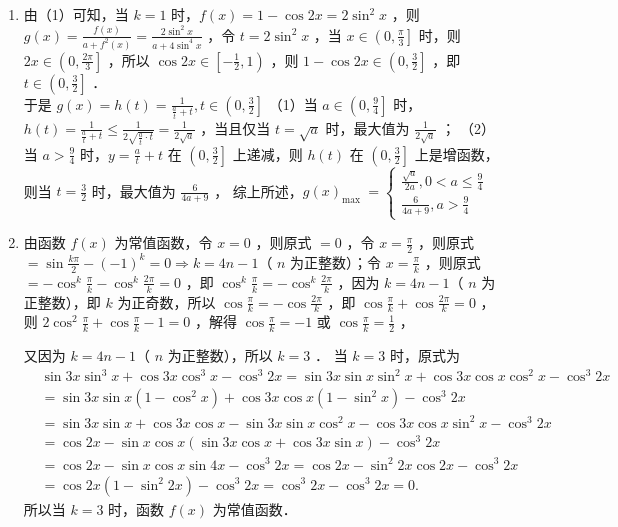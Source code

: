 \begin{enumerate}
\begin{jieda}
\begin{enumerate}[(1)]
    \item 由（1）可知，当 $k=1$ 时，$f(x)=1-\cos 2 x=2 \sin ^2 x$ ，则 $g(x)=\frac{f(x)}{a+f^2(x)}=\frac{2 \sin ^2 x}{a+4 \sin ^4 x}$ ，令 $t=2 \sin ^2 x$ ，当 $x \in\left(0, \frac{\pi}{3}\right]$ 时，则 $2 x \in\left(0, \frac{2 \pi}{3}\right]$ ，所以 $\cos 2 x \in\left[-\frac{1}{2}, 1\right)$ ，则 $1-\cos 2 x \in\left(0, \frac{3}{2}\right]$ ，即 $t \in\left(0, \frac{3}{2}\right]$ ．\\
    于是 $g(x)=h(t)=\frac{1}{\frac{a}{t}+t}, t \in\left(0, \frac{3}{2}\right]$
（1）当 $a \in\left(0, \frac{9}{4}\right]$ 时，$h(t)=\frac{1}{\frac{a}{t}+t} \leq \frac{1}{2 \sqrt{\frac{a}{t} \cdot t}}=\frac{1}{2 \sqrt{a}}$ ，当且仅当 $t=\sqrt{a}$ 时，最大值为 $\frac{1}{2 \sqrt{a}}$ ；
（2）当 $a>\frac{9}{4}$ 时，$y=\frac{a}{t}+t$ 在 $\left(0, \frac{3}{2}\right]$ 上递减，则 $h(t)$ 在 $\left(0, \frac{3}{2}\right]$ 上是增函数，则当 $t=\frac{3}{2}$ 时，最大值为 $\frac{6}{4 a+9}$ ，
综上所述，$g(x)_{\text {max }}=\left\{\begin{array}{l}\frac{\sqrt{a}}{2 a}, 0<a \leq \frac{9}{4} \\ \frac{6}{4 a+9}, a>\frac{9}{4}\end{array}\right.$
    \item 由函数 $f(x)$ 为常值函数，令 $x=0$ ，则原式 $=0$ ，令 $x=\frac{\pi}{2}$ ，则原式 $=\sin \frac{k \pi}{2}-(-1)^k=0 \Rightarrow k=4 n-1$（ $n$ 为正整数）；令 $x=\frac{\pi}{k}$ ，则原式 $=-\cos ^k \frac{\pi}{k}-\cos ^k \frac{2 \pi}{k}=0$ ，即 $\cos ^k \frac{\pi}{k}=-\cos ^k \frac{2 \pi}{k}$ ，因为 $k=4 n-1$（ $n$ 为正整数），即 $k$ 为正奇数，所以 $\cos \frac{\pi}{k}=-\cos \frac{2 \pi}{k}$ ，即 $\cos \frac{\pi}{k}+\cos \frac{2 \pi}{k}=0$ ，则 $2 \cos ^2 \frac{\pi}{k}+\cos \frac{\pi}{k}-1=0$ ，解得 $\cos \frac{\pi}{k}=-1$ 或 $\cos \frac{\pi}{k}=\frac{1}{2}$ ，

又因为 $k=4 n-1$（ $n$ 为正整数），所以 $k=3$ ．
当 $k=3$ 时，原式为
$$
\begin{aligned}
& \sin 3 x \sin ^3 x+\cos 3 x \cos ^3 x-\cos ^3 2 x=\sin 3 x \sin x \sin ^2 x+\cos 3 x \cos x \cos ^2 x-\cos ^3 2 x \\
& =\sin 3 x \sin x\left(1-\cos ^2 x\right)+\cos 3 x \cos x\left(1-\sin ^2 x\right)-\cos ^3 2 x \\
& =\sin 3 x \sin x+\cos 3 x \cos x-\sin 3 x \sin x \cos ^2 x-\cos 3 x \cos x \sin ^2 x-\cos ^3 2 x \\
& =\cos 2 x-\sin x \cos x(\sin 3 x \cos x+\cos 3 x \sin x)-\cos ^3 2 x \\
& =\cos 2 x-\sin x \cos x \sin 4 x-\cos ^3 2 x=\cos 2 x-\sin ^2 2 x \cos 2 x-\cos ^3 2 x \\
& =\cos 2 x\left(1-\sin ^2 2 x\right)-\cos ^3 2 x=\cos ^3 2 x-\cos ^3 2 x=0 .
\end{aligned}
$$
所以当 $k=3$ 时，函数 $f(x)$ 为常值函数．
\end{enumerate}   
\end{jieda}

\end{enumerate}


